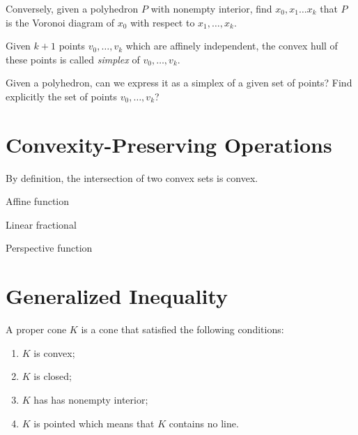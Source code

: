 \documentclass[a4paper, 12pt]{book}
\begin{document}
\begin{exercise}
    Conversely, given a polyhedron $P$ with nonempty interior, find $x_0, x_1 \dots x_k$ that $P$ is the Voronoi diagram of $x_0$ with respect to $x_1, \dots, x_k$.
\end{exercise}

Given $k+1$ points $v_0, \dots, v_k$ which are affinely independent, the convex hull of these points is called \emph{simplex} of $v_0, \dots, v_k$. 

\begin{exercise}
    Given a polyhedron, can we express it as a simplex of a given set of points? Find explicitly the set of points $v_0, \dots, v_k$?
\end{exercise}


\section{Convexity-Preserving Operations}
\label{sec:convexity_preserving_operations}

By definition, the intersection of two convex sets is convex.

Affine function

Linear fractional 

Perspective function








\section{Generalized Inequality}
\label{sec:generalized_inequality}

\begin{definition}
A proper cone $K$ is a cone that satisfied the following conditions: 
    \begin{enumerate}
        \item $K$ is convex;
        \item $K$ is closed;
        \item $K$ has has nonempty interior;
        \item $K$ is pointed which means that $K$ contains no line.
    \end{enumerate}

\end{definition}
\end{document}
